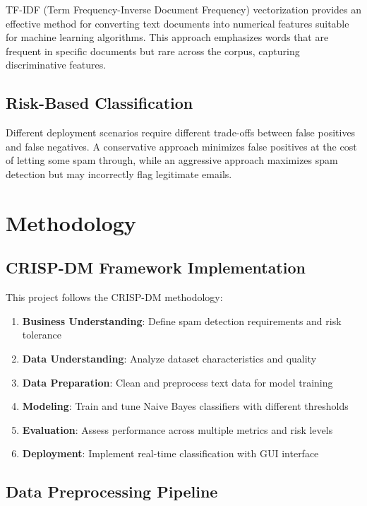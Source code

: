 \documentclass[12pt,a4paper]{article}
\begin{document}
TF-IDF (Term Frequency-Inverse Document Frequency) vectorization provides an effective method for converting text documents into numerical features suitable for machine learning algorithms. This approach emphasizes words that are frequent in specific documents but rare across the corpus, capturing discriminative features.

\subsection{Risk-Based Classification}

Different deployment scenarios require different trade-offs between false positives and false negatives. A conservative approach minimizes false positives at the cost of letting some spam through, while an aggressive approach maximizes spam detection but may incorrectly flag legitimate emails.

\section{Methodology}

\subsection{CRISP-DM Framework Implementation}

This project follows the CRISP-DM methodology:

\begin{enumerate}
    \item \textbf{Business Understanding}: Define spam detection requirements and risk tolerance
    \item \textbf{Data Understanding}: Analyze dataset characteristics and quality
    \item \textbf{Data Preparation}: Clean and preprocess text data for model training
    \item \textbf{Modeling}: Train and tune Naive Bayes classifiers with different thresholds
    \item \textbf{Evaluation}: Assess performance across multiple metrics and risk levels
    \item \textbf{Deployment}: Implement real-time classification with GUI interface
\end{enumerate}

\subsection{Data Preprocessing Pipeline}
\end{document}
